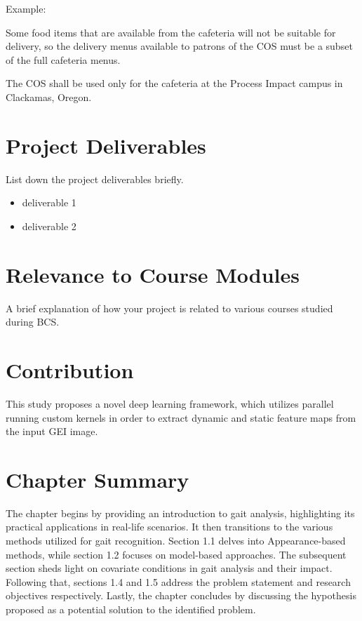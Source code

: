 \documentclass[A4paper,12pt]{report}
\theoremstyle{plain}
\theoremstyle{definition}
\theoremstyle{remark}
\numberwithin{equation}{section}
\begin{document}
Example:

\begin{description}[noitemsep,nolistsep,leftmargin=2cm]
	\item [L1] Some food items that are available from the cafeteria will not be suitable for delivery, so the delivery menus available to patrons of the COS must be a subset of the full cafeteria menus. 
	\item [L2] The COS shall be used only for the cafeteria at the Process Impact campus in Clackamas, Oregon. 
\end{description}


\section{Project Deliverables}
List down the project deliverables briefly.
\begin{itemize}
	\item deliverable 1
	\item deliverable 2
\end{itemize}



\section{Relevance to Course Modules}
A brief explanation of how your project is related to various courses studied during BCS.



\section{ Contribution }

This study proposes a novel deep learning framework, which utilizes parallel running custom kernels in order to extract dynamic and static feature maps from the input GEI image. 



\section{ Chapter Summary }

The chapter begins by providing an introduction to gait analysis, highlighting its practical applications in real-life scenarios. It then transitions to the various methods utilized for gait recognition. Section 1.1 delves into Appearance-based methods, while section 1.2 focuses on model-based approaches. The subsequent section sheds light on covariate conditions in gait analysis and their impact. Following that, sections 1.4 and 1.5 address the problem statement and research objectives respectively. Lastly, the chapter concludes by discussing the hypothesis proposed as a potential solution to the identified problem.
\end{document}
